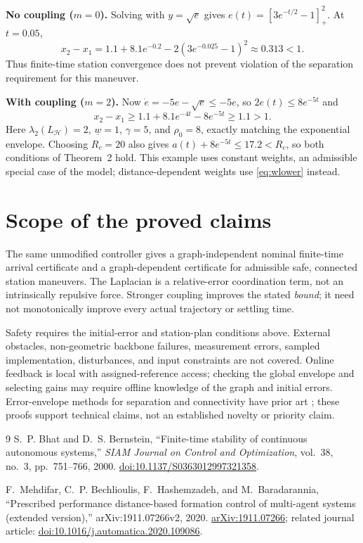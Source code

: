 \documentclass[11pt,a4paper]{article}
\theoremstyle{remark}
\newcommand{\pos}[1]{\left[#1\right]_{+}}
\begin{document}
\textbf{No coupling ($m=0$).}
Solving with $y=\sqrt e$ gives
$e(t)=\pos{3e^{-t/2}-1}^{2}$.
At $t=0.05$,
\[
x_2-x_1=1.1+8.1e^{-0.2}-2(3e^{-0.025}-1)^2\approx0.313<1.
\]
Thus finite-time station convergence does not prevent violation of the separation requirement for this maneuver.

\textbf{With coupling ($m=2$).}
Now $\dot e=-5e-\sqrt e\le-5e$, so $2e(t)\le8e^{-5t}$ and
\begin{equation}
x_2-x_1\ge1.1+8.1e^{-4t}-8e^{-5t}\ge1.1>1.
\label{eq:example-safe}
\end{equation}
Here $\lambda_2(L_{\mathcal H})=2$, $\underline w=1$, $\gamma=5$, and $\rho_0=8$, exactly matching the exponential envelope. Choosing $R_c=20$ also gives
$a(t)+8e^{-5t}\le17.2<R_c$, so both conditions of Theorem~2 hold. This example uses constant weights, an admissible special case of the model; distance-dependent weights use \eqref{eq:wlower} instead.

\section{Scope of the proved claims}

The same unmodified controller gives a graph-independent nominal finite-time arrival certificate and a graph-dependent certificate for admissible safe, connected station maneuvers. The Laplacian is a relative-error coordination term, not an intrinsically repulsive force. Stronger coupling improves the stated \emph{bound}; it need not monotonically improve every actual trajectory or settling time.

Safety requires the initial-error and station-plan conditions above. External obstacles, non-geometric backbone failures, measurement errors, sampled implementation, disturbances, and input constraints are not covered. Online feedback is local with assigned-reference access; checking the global envelope and selecting gains may require offline knowledge of the graph and initial errors. Error-envelope methods for separation and connectivity have prior art \cite{mehdifar}; these proofs support technical claims, not an established novelty or priority claim.

\begin{thebibliography}{9}
\small
{}
S.~P. Bhat and D.~S. Bernstein, ``Finite-time stability of continuous autonomous systems,'' \emph{SIAM Journal on Control and Optimization}, vol.~38, no.~3, pp.~751--766, 2000.
\href{https://doi.org/10.1137/S0363012997321358}{doi:10.1137/S0363012997321358}.

F.~Mehdifar, C.~P. Bechlioulis, F.~Hashemzadeh, and M.~Baradarannia,
``Prescribed performance distance-based formation control of multi-agent systems (extended version),'' arXiv:1911.07266v2, 2020.
\href{https://arxiv.org/abs/1911.07266}{arXiv:1911.07266}; related journal article:
\href{https://doi.org/10.1016/j.automatica.2020.109086}{doi:10.1016/j.automatica.2020.109086}.
\end{thebibliography}
\end{document}
